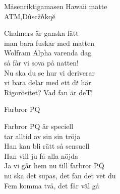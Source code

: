 \begin{song}{Måsen}{riktigamasen}
{\Large Hawaii matte}\\{\tiny  ATM,Dûscž$\hbar$kqĕ}
\begin{vers}

Chalmers är ganska lätt\\
man bara fuskar med matten\\
Wolfram Alpha varenda dag\\
så får vi sova på natten! \\
Nu ska du se hur vi deriverar\\
vi bara delar med ett $\mathrm{d}t$ här\\
Rigorösitet? Vad fan är deT! \\
\end{vers}

{\Large Farbror PQ}
\begin{vers}
Farbror PQ är speciell\\
tar alltid av sin sin tröja\\
Han kan bli rätt så sensuell\\
Han vill ju få alla nöjda\\
Ja vi går hem nu till farbror PQ\\
nu ska det supas, det fan det vet du\\
Fem komma två, det får väl gå
\end{vers}

\end{song}